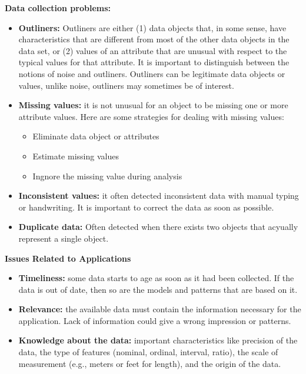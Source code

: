 	{\bf Data collection problems:}
		\begin{itemize}
			\item {\bf Outliners:} Outliners are either (1) data objects that, in some
			sense, have characteristics that are different from most of the other data
			objects in the data set, or (2) values of an attribute that are unusual with
			respect to the typical values for that attribute. It is important to distinguish
			between the notions of noise and outliners. Outliners can be legitimate data
			objects or values, unlike noise, outliners may sometimes be of interest. 
			\item {\bf Missing values:} it is not unusual for an object to be missing one 
			or more attribute values. Here are some strategies for dealing with missing values:
				\begin{itemize}
					\item Eliminate data object or attributes
					\item Estimate missing values
					\item Ingnore the missing value during analysis
				\end{itemize}
			\item {\bf Inconsistent values:} it often detected inconsistent data with manual
			typing or handwriting. It is important to correct the data as soon as possible.
			\item {\bf Duplicate data:} Often detected when there exists two objects that 
			acyually represent a single object. 
		\end{itemize}

	{\bf Issues Related to Applications}
		\begin{itemize}
			\item {\bf Timeliness:} some data starts to age as soon as it had been 
			collected. If the data is out of date, then so are the models and patterns
			that are based on it. 
			\item {\bf Relevance:} the available data must contain the information necessary
			for the application. Lack of information could give a wrong impression or patterns.
			\item {\bf Knowledge about the data:} important characteristics like precision of the
			data, the type of features (nominal, ordinal, interval, ratio), the scale of 
			measurement (e.g., meters or feet for length), and the origin of the data.
		\end{itemize}

		\vspace{1cm}

